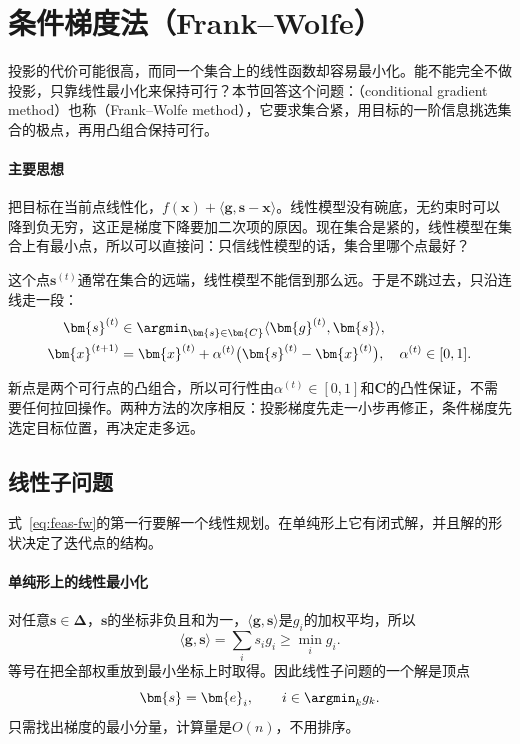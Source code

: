 \section{条件梯度法（Frank--Wolfe）}
\label{sec:feas-fw}

投影的代价可能很高，而同一个集合上的线性函数却容易最小化。能不能完全不做投影，只靠线性最小化来保持可行？本节回答这个问题：（conditional gradient method）也称（Frank--Wolfe method），它要求集合紧，用目标的一阶信息挑选集合的极点，再用凸组合保持可行。

\paragraph{主要思想}
把目标在当前点线性化，$f(\bm{x})+\langle\bm{g},\bm{s}-\bm{x}\rangle$。线性模型没有碗底，无约束时可以降到负无穷，这正是梯度下降要加二次项的原因。现在集合是紧的，线性模型在集合上有最小点，所以可以直接问：只信线性模型的话，集合里哪个点最好？

这个点$\bm{s}^{(t)}$通常在集合的远端，线性模型不能信到那么远。于是不跳过去，只沿连线走一段：
\begin{equation}
 \begin{aligned}
 \bm{s}^{(t)}&\in\argmin_{\bm{s}\in\bm{C}}\langle\bm{g}^{(t)},\bm{s}\rangle,\\
 \bm{x}^{(t+1)}&=\bm{x}^{(t)}+\alpha^{(t)}\bigl(\bm{s}^{(t)}-\bm{x}^{(t)}\bigr),\quad\alpha^{(t)}\in[0,1].
 \end{aligned}
 \label{eq:feas-fw}
\end{equation}

新点是两个可行点的凸组合，所以可行性由$\alpha^{(t)}\in[0,1]$和$\bm{C}$的凸性保证，不需要任何拉回操作。两种方法的次序相反：投影梯度先走一小步再修正，条件梯度先选定目标位置，再决定走多远。

\subsection{线性子问题}
\label{sec:feas-fw-linear}

式~\eqref{eq:feas-fw}的第一行要解一个线性规划。在单纯形上它有闭式解，并且解的形状决定了迭代点的结构。

\paragraph{单纯形上的线性最小化}
对任意$\bm{s}\in\bm{\Delta}$，$\bm{s}$的坐标非负且和为一，$\langle\bm{g},\bm{s}\rangle$是$g_i$的加权平均，所以
\[
 \langle\bm{g},\bm{s}\rangle=\sum_is_ig_i\geq\min_ig_i.
\]
等号在把全部权重放到最小坐标上时取得。因此线性子问题的一个解是顶点
\begin{equation}
 \bm{s}=\bm{e}_{i},\qquad i\in\argmin_kg_k.
 \label{eq:feas-simplex-lmo}
\end{equation}
只需找出梯度的最小分量，计算量是$O(n)$，不用排序。

